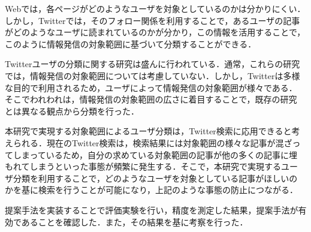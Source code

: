\begin{jabstract}
Webでは，各ページがどのようなユーザを対象としているのかは分かりにくい．
 しかし，Twitterでは，そのフォロー関係を利用することで，あるユーザの記事
 がどのようなユーザに読まれているのかが分かり，この情報を活用することで，
 このように情報発信の対象範囲に基づいて分類することができる．

Twitterユーザの分類に関する研究は盛んに行われている．通常，これらの研究
 では，情報発信の対象範囲については考慮していない．しかし，Twitterは多様
 な目的で利用されるため，ユーザによって情報発信の対象範囲が様々である．
 そこでわれわれは，情報発信の対象範囲の広さに着目することで，既存の研究
 とは異なる観点から分類を行った．

本研究で実現する対象範囲によるユーザ分類は，Twitter検索に応用できると考
 えられる．現在のTwitter検索は，検索結果には対象範囲の様々な記事が混ざっ
 てしまっているため，自分の求めている対象範囲の記事が他の多くの記事に埋
 もれてしまうといった事態が頻繁に発生する．そこで，本研究で実現するユー
 ザ分類を利用することで，どのようなユーザを対象としている記事がほしいの
 かを基に検索を行うことが可能になり，上記のような事態の防止につながる．

提案手法を実装することで評価実験を行い，精度を測定した結果，提案手法が有
 効であることを確認した．また，その結果を基に考察を行った．
\end{jabstract}
